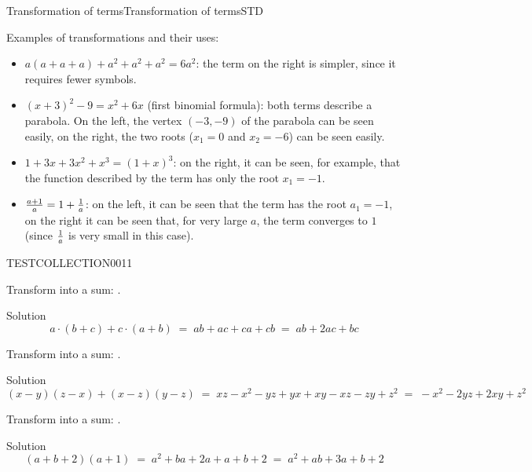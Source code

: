 \begin{MXContent}{Transformation of terms}{Transformation of terms}{STD}
\begin{MExample}
Examples of transformations and their uses:
\begin{itemize}
\item{$a(a+a+a)+a^2+a^2+a^2 = 6a^2$: the term on the right is simpler, since it requires fewer symbols.}
\item{$(x+3)^2-9=x^2+6x$ (first binomial formula): both terms describe a parabola. On the left, 
the vertex $(-3,-9)$ of the parabola can be seen easily, on the right, the two roots ($x_1=0$ and $x_2=-6$)
can be seen easily.}
\item{$1+3x+3x^2+x^3=(1+x)^3$: on the right, it can be seen, for example, that the function described by the 
term has only the root $x_1=-1$.}
\item{$\tfrac{a+1}{a}=1+\tfrac{1}{a}$: on the left, it can be seen that the term has the root $a_1=-1$, 
on the right it can be seen that, for very large $a$, the term converges to $1$ (since $\tfrac{1}{a}$ is very 
small in this case).}
\end{itemize}
\end{MExample}


\begin{MExerciseCollection}{TESTCOLLECTION001}{1}

\begin{MExercise}
Transform into a sum: .
\begin{MHint}{Solution}
$$
a\cdot(b+c)+c\cdot(a+b) \;=\; a b + a c + c a + c b \;=\; a b + 2 a c + b c
$$
\end{MHint}
\end{MExercise}
\newpage

\begin{MExercise}
Transform into a sum: .
\begin{MHint}{Solution}
$$
(x-y)(z-x)+(x-z)(y-z) \;=\; x z - x^2 -y z +y x + x y - x z - z y + z^2 \;=\; -x^2 - 2 y z + 2 x y + z^2
$$
\end{MHint}
\end{MExercise}

\begin{MExercise}
Transform into a sum: .
\begin{MHint}{Solution}
$$
(a+b+2)(a+1) \;=\; a^2 + b a + 2a + a + b + 2 \;=\; a^2 + a b + 3a + b +2
$$
\end{MHint}
\end{MExercise}

\end{MExerciseCollection}




\end{MXContent}


